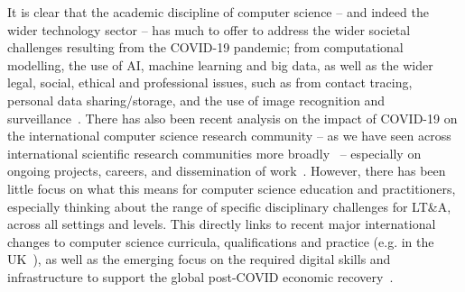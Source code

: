 \documentclass[sigconf]{acmart}
\begin{document}
It is clear that the academic discipline of computer science -- and
indeed the wider technology sector -- has much to offer to address the
wider societal challenges resulting from the COVID-19 pandemic; from
computational modelling, the use of AI, machine learning and big data,
as well as the wider legal, social, ethical and professional issues,
such as from contact tracing, personal data sharing/storage, and the
use of image recognition and
surveillance~\cite{dwivedi-et-al:ijim2019,ting-et-al:2020,cerf:2020,chun-et-al:2020,rcjbbcnews:2020}. There
has also been recent analysis on the impact of COVID-19 on the
international computer science research community -- as we have seen
across international scientific research communities more
broadly~\cite{oecdcovid19:2020} -- especially on ongoing projects,
careers, and dissemination of work~\cite{msrcovid19:2020}. However,
there has been little focus on what this means for computer science
education and practitioners, especially thinking about the range of
specific disciplinary challenges for LT\&A, across all settings and
levels. This directly links to recent major international changes to
computer science curricula, qualifications and practice (e.g. in the
UK~\cite{brown-et-al-toce2014}), as well as the emerging focus on the
required digital skills and infrastructure to support the global
post-COVID economic
recovery~\cite{davenport-et-al:educon2020,euparl:2020,mckinsey:2020}.


\end{document}
